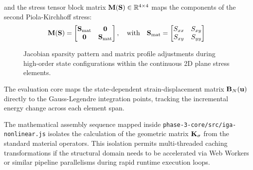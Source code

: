 and the stress tensor block matrix $\mathbf{M}(\mathbf{S}) \in \mathbb{R}^{4 \times 4}$ maps the components of the second Piola-Kirchhoff stress:
\begin{equation}
        \mathbf{M}(\mathbf{S}) = \begin{bmatrix} \mathbf{S}_{\text{mat}} & \mathbf{0} \\ \mathbf{0} & \mathbf{S}_{\text{mat}} \end{bmatrix}, \quad \text{with} \quad \mathbf{S}_{\text{mat}} = \begin{bmatrix} S_{xx} & S_{xy} \\ S_{xy} & S_{yy} \end{bmatrix}
\end{equation}

\begin{figure}[H]
    \centering
    \vspace{4cm}
    \caption{Jacobian sparsity pattern and matrix profile adjustments during high-order state configurations within the continuous 2D plane stress elements.}
    \label{fig:jacobian_pattern}
\end{figure}

The evaluation core maps the state-dependent strain-displacement matrix $\mathbf{B}_N(\mathbf{u})$ directly to the Gauss-Legendre integration points, tracking the incremental energy change across each element span.

\begin{devnote}
The mathematical assembly sequence mapped inside \texttt{phase-3-core/src/iga-nonlinear.js} isolates the calculation of the geometric matrix $\mathbf{K}_{\sigma}$ from the standard material operators. This isolation permits multi-threaded caching transformations if the structural domain needs to be accelerated via Web Workers or similar pipeline parallelisms during rapid runtime execution loops.
\end{devnote}